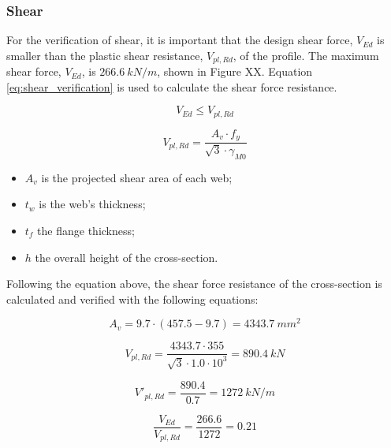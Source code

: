 
\subsubsection{Shear}

For the verification of shear, it is important that the design shear force, $V_{Ed}$ is smaller than the plastic shear resistance, $V_{pl,Rd}$, of the profile. The maximum shear force, $V_{Ed}$, is $266.6 \ kN/m$, shown in Figure XX. Equation \ref{eq:shear_verification} is used to calculate the shear force resistance.

\begin{equation}
    V_{Ed} \leq V_{pl,Rd}
    \label{eq:shear_plastic}
\end{equation}

\begin{equation}
    V_{pl,Rd} = \frac{A_v \cdot f_{y}}{\sqrt{3} \cdot \gamma_{M0}}
    \label{eq:shear_verification}
\end{equation}

\begin{itemize}
    \item $A_{v}$ is the projected shear area of each web;
    \item $t_w$ is the web’s thickness;
    \item $t_f$ the flange thickness;
    \item $h$ the overall height of the cross-section.
\end{itemize}

Following the equation above, the shear force resistance of the cross-section is calculated and verified with the following equations:

\begin{equation}
    A_v = 9.7 \cdot (457.5 - 9.7) = 4343.7 \ mm^2
\end{equation}

\begin{equation}
    V_{pl,Rd} = \frac{4343.7 \cdot 355}{\sqrt{3} \cdot 1.0 \cdot 10^3} = 890.4 \ kN 
\end{equation}

\begin{equation}
    V'_{pl,Rd} = \frac{890.4}{0.7} = 1272 \ kN/m 
\end{equation}

\begin{equation}
    \frac{V_{Ed}}{V_{pl,Rd}} = \frac{266.6}{1272} = 0.21 
\end{equation}

